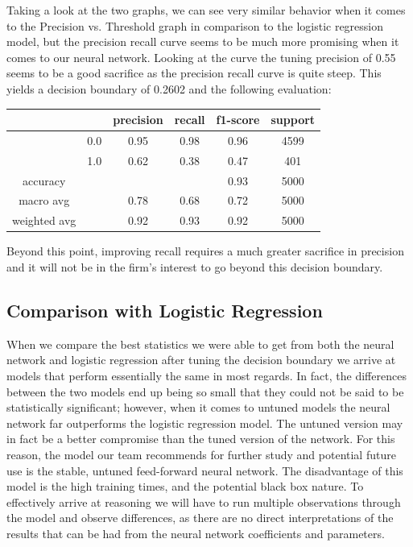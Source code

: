 \documentclass[12pt]{article}
\begin{document}
	Taking a look at the two graphs, we can see very similar behavior when it comes to the Precision vs. Threshold graph in comparison to the logistic regression model, but the precision recall curve seems to be much more promising when it comes to our neural network. Looking at the curve the tuning precision of 0.55 seems to be a good sacrifice as the precision recall curve is quite steep. This yields a decision boundary of 0.2602 and the following evaluation: 
	
	\begin{tabular}{c|c|c|c|c|c}
		\hline
		& 		& 	precision &  recall  & f1-score   & support \\ \hline
		
		&  0.0	&		0.95 &     0.98   &  0.96   &  4599 \\ \hline
		&  1.0  &		0.62 &     0.38   &  0.47   &   401 \\ \hline
		
		accuracy    & & & &                       		  0.93   &   5000 \\ \hline
		macro avg   & &   			0.78   &   0.68  &    0.72   &   5000  \\ \hline
		weighted avg  & &   		0.92   &   0.93  &    0.92   &   5000 \\ \hline
	\end{tabular}
	
	Beyond this point, improving recall requires a much greater sacrifice in precision and it will not be in the firm's interest to go beyond this decision boundary. 
	
	\subsection{Comparison with Logistic Regression}
	
	When we compare the best statistics we were able to get from both the neural network and logistic regression after tuning the decision boundary we arrive at models that perform essentially the same in most regards. In fact, the differences between the two models end up being so small that they could not be said to be statistically significant; however, when it comes to untuned models the neural network far outperforms the logistic regression model. The untuned version may in fact be a better compromise than the tuned version of the network. For this reason, the model our team recommends for further study and potential future use is the stable, untuned feed-forward neural network. The disadvantage of this model is the high training times, and the potential black box nature. To effectively arrive at reasoning we will have to run multiple observations through the model and observe differences, as there are no direct interpretations of the results that can be had from the neural network coefficients and parameters. 
	
\end{document}
